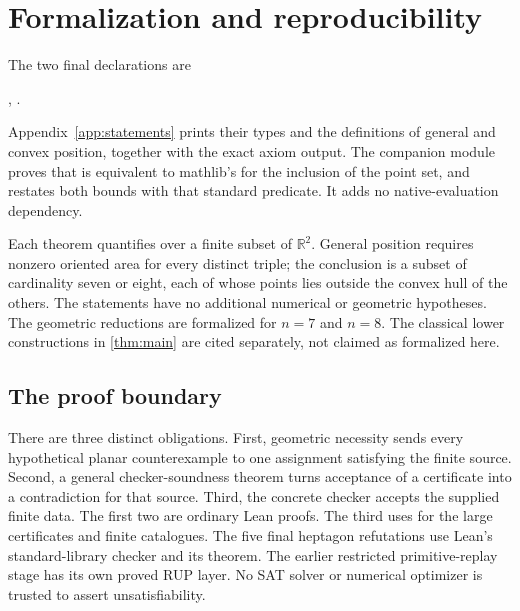 \section{Formalization and reproducibility}\label{sec:formal}\label{sec:certificates}
The two final declarations are
\begin{center}
,\qquad
{}.
\end{center}
Appendix~\ref{app:statements} prints their types and the definitions
of general and convex position, together with the exact axiom output.
The companion module  proves that
 is equivalent to mathlib's
 for the inclusion of the point set, and
restates both bounds with that standard predicate. It adds no
native-evaluation dependency.

Each theorem quantifies over a finite subset of $\mathbb R^2$. General position
requires nonzero oriented area for every distinct triple; the conclusion
is a subset of cardinality seven or eight, each of whose points lies
outside the convex hull of the others. The statements have no additional
numerical or geometric hypotheses. The geometric reductions are formalized for $n=7$ and $n=8$.
The classical lower constructions in \cref{thm:main} are cited
separately, not claimed as formalized here.

\subsection{The proof boundary}
There are three distinct obligations. First, geometric necessity sends
every hypothetical planar counterexample to one assignment satisfying
the finite source. Second, a general checker-soundness theorem turns
acceptance of a certificate into a contradiction for that source.
Third, the concrete checker accepts the supplied finite data.
The first two are ordinary Lean proofs. The third uses
 for the large certificates and finite catalogues.
The five final heptagon refutations use Lean's standard-library
 checker and its 
theorem. The earlier restricted primitive-replay stage has its own
proved RUP layer. No SAT solver or numerical optimizer is trusted to
assert unsatisfiability.

